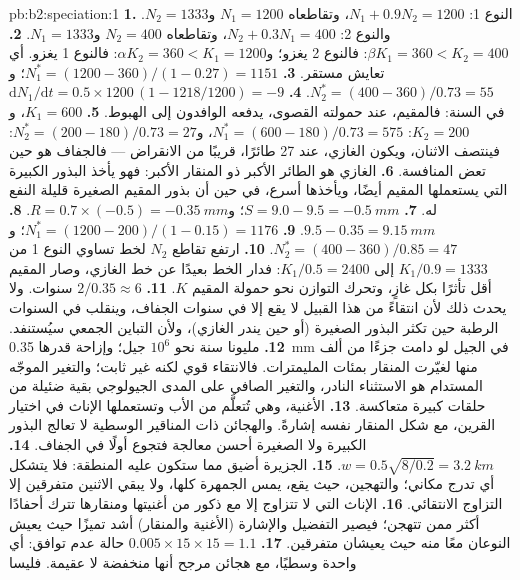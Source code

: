 \begin{solution}{pb:b2:speciation:1}
\textbf{1.} النوع 1: $N_1 + 0.9N_2 = 1200$، وتقاطعاه $N_1 = 1200$
و$N_2 = 1333$. والنوع 2: $N_2 + 0.3N_1 = 400$، وتقاطعاه $N_2 =
400$ و$N_1 = 1333$.
\textbf{2.} $\beta K_1 = 360 < K_2 = 400$: فالنوع 2 يغزو؛
و$\alpha K_2 = 360 < K_1 = 1200$: فالنوع 1 يغزو. أي تعايش
مستقر.
\textbf{3.} $N_1^{*} = (1200 - 360)/(1 - 0.27) = 1151$؛ و$N_2^{*} =
(400 - 360)/0.73 = 55$.
\textbf{4.} $\mathrm{d}N_1/\mathrm{d}t = 0.5\times 1200\,(1 - 1218/1200)
= -9$ في السنة: فالمقيم، عند حمولته القصوى، يدفعه الوافدون
إلى الهبوط.
\textbf{5.} $K_1 = 600$، و$K_2 = 200$: $N_1^{*} = (600 - 180)/0.73 =
575$، و$N_2^{*} = (200 - 180)/0.73 = 27$: فينتصف الاثنان، ويكون الغازي،
عند 27 طائرًا، قريبًا من الانقراض --- فالجفاف هو حين
تعض المنافسة.
\textbf{6.} الغازي هو الطائر الأكبر ذو المنقار الأكبر: فهو
يأخذ البذور الكبيرة التي يستعملها المقيم أيضًا، ويأخذها
أسرع، في حين أن بذور المقيم الصغيرة قليلة النفع له.
\textbf{7.} $S = 9.0 - 9.5 = \qty{-0.5}{mm}$؛ و$R = 0.7\times(-0.5) =
\qty{-0.35}{mm}$.
\textbf{8.} $9.5 - 0.35 = \qty{9.15}{mm}$.
\textbf{9.} $N_1^{*} = (1200 - 200)/(1 - 0.15) = 1176$؛ و$N_2^{*} =
(400 - 360)/0.85 = 47$.
\textbf{10.} ارتفع تقاطع $N_2$ لخط تساوي النوع 1 من
$K_1/0.9 = 1333$ إلى $K_1/0.5 = 2400$: فدار الخط بعيدًا عن
خط الغازي، وصار المقيم أقل تأثرًا بكل غازٍ،
وتحرك التوازن نحو حمولة المقيم $K$.
\textbf{11.} $2/0.35 \approx 6$ سنوات. ولا يحدث ذلك لأن انتقاءً
من هذا القبيل لا يقع إلا في سنوات الجفاف، وينقلب في السنوات الرطبة
حين تكثر البذور الصغيرة (أو حين يندر الغازي)،
ولأن التباين الجمعي سيُستنفد.
\textbf{12.} مليونا سنة نحو $10^{6}$ جيل؛ وإزاحة
قدرها \qty{0.35}{mm} في الجيل لو دامت جزءًا من ألف
منها لغيّرت المنقار بمئات المليمترات. فالانتقاء
قوي لكنه غير ثابت؛ والتغير الموجّه المستدام هو الاستثناء
النادر، والتغير الصافي على المدى الجيولوجي بقية ضئيلة
من حلقات كبيرة متعاكسة.
\textbf{13.} الأغنية، وهي تُتعلَّم من الأب وتستعملها الإناث في
اختيار القرين، مع شكل المنقار نفسه إشارةً. والهجائن ذات
المناقير الوسطية لا تعالج البذور الكبيرة ولا الصغيرة
أحسن معالجة فتجوع أولًا في الجفاف.
\textbf{14.} $w = 0.5\sqrt{8/0.2} = \qty{3.2}{km}$.
\textbf{15.} الجزيرة أضيق مما ستكون عليه المنطقة: فلا
يتشكل أي تدرج مكاني؛ والتهجين، حيث يقع، يمس
الجمهرة كلها، ولا يبقي الاثنين متفرقين إلا التزاوج
الانتقائي.
\textbf{16.} الإناث التي لا تتزاوج إلا مع ذكور من أغنيتها
ومنقارها تترك أحفادًا أكثر ممن تتهجن؛ فيصير التفضيل
والإشارة (الأغنية والمنقار) أشد تميزًا حيث يعيش
النوعان معًا منه حيث يعيشان متفرقين.
\textbf{17.} $0.005\times 15\times 15 = 1.1$ حالة عدم توافق: أي
واحدة وسطيًا، مع هجائن مرجح أنها منخفضة  لا عقيمة. فليسا

\end{solution}
